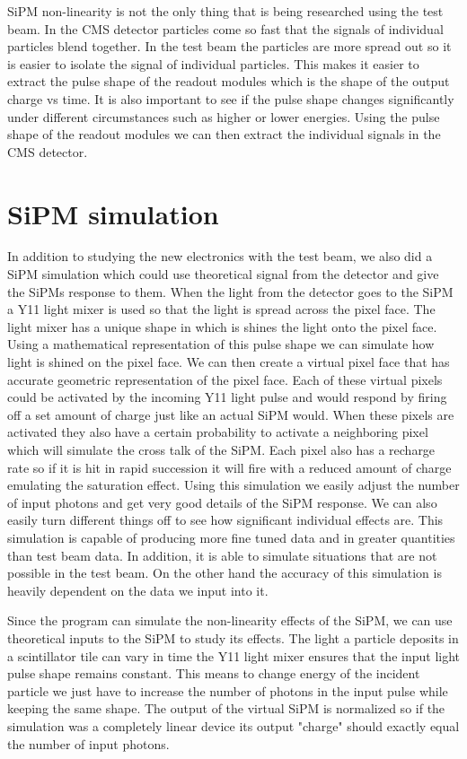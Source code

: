 SiPM non-linearity is not the only thing that is being researched using the test beam. In the CMS detector particles come so fast that the signals of individual particles blend together. In the test beam the particles are more spread out so it is easier to isolate the signal of individual particles. This makes it easier to extract the pulse shape of the readout modules which is the shape of the output charge vs time. It is also important to see if the pulse shape changes significantly under different circumstances such as higher or lower energies. Using the pulse shape of the readout modules we can then extract the individual signals in the CMS detector.

\section{SiPM simulation}
In addition to studying the new electronics with the test beam, we also did a SiPM simulation which could use theoretical signal from the detector and give the SiPMs response to them. When the light from the detector goes to the SiPM a Y11 light mixer is used so that the light is spread across the pixel face. The light mixer has a unique shape in which is shines the light onto the pixel face. Using a mathematical representation of this pulse shape we can simulate how light is shined on the pixel face. We can then create a virtual pixel face that has accurate geometric representation of the pixel face. Each of these virtual pixels could be activated by the incoming Y11 light pulse and would respond by firing off a set amount of charge just like an actual SiPM would. When these pixels are activated they also have a certain probability to activate a neighboring pixel which will simulate the cross talk of the SiPM. Each pixel also has a recharge rate so if it is hit in rapid succession it will fire with a reduced amount of charge emulating the saturation effect. Using this simulation we easily adjust the number of input photons and get very good details of the SiPM response. We can also easily turn different things off to see how significant individual effects are. This simulation is capable of producing more fine tuned data and in greater quantities than test beam data. In addition, it is able to simulate situations that are not possible in the test beam. On the other hand the accuracy of this simulation is heavily dependent on the data we input into it.

Since the program can simulate the non-linearity effects of the SiPM, we can use theoretical inputs to the SiPM to study its effects. The light a particle deposits in a scintillator tile can vary in time the Y11 light mixer ensures that the input light pulse shape remains constant. This means to change energy of the incident particle we just have to increase the number of photons in the input pulse while keeping the same shape. The output of the virtual SiPM is normalized so if the simulation was a completely linear device its output "charge" should exactly equal the number of input photons. 

